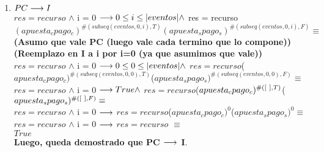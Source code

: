\documentclass[10pt,a4paper]{article}
\begin{document}
\begin{flushleft}
\begin{enumerate} \setlength\itemsep{4mm}
	\item \textbf{$PC \longrightarrow I$} \\
	\vspace{2mm}
	$res= recurso$ $\wedge$ i = 0 $\longrightarrow 0\leq i\leq|eventos| \wedge$ res = recurso$(apuesta_cpago_c)^{\#(subseq(eventos,0,i),T)}(apuesta_spago_s)^{\#(subseq(eventos,0,i),F)} \equiv$\\
	\vspace{3mm}
	\textbf{(Asumo que vale PC (luego vale cada termino que lo compone))}\\
	\vspace{3mm}
	\textbf{(Reemplazo en I a i por i=0 (ya que asumimos que vale))}\\
	\vspace{3mm}
	$res= recurso$ $\wedge$ i = 0 $\longrightarrow 0\leq 0\leq|eventos| \wedge$ $res=recurso$($apuesta_cpago_c)^{\#(subseq(eventos,0,0),T)}$($apuesta_spago_s)^{\#(subseq(eventos,0,0),F)} \equiv$\\
	\vspace{2mm}
	$res= recurso$ $\wedge$ i = 0  $\longrightarrow  True  \wedge$ $res=recurso$($apuesta_cpago_c)^{\#([\ ],T)}$($apuesta_spago_s)^{\#([\ ],F)} \equiv$ \\
	\vspace{2mm}
	$res= recurso$ $\wedge$ i = 0  $\longrightarrow$ $res=recurso$($apuesta_cpago_c)^{0}$($apuesta_spago_s)^{0} \equiv $\\
	\vspace{2mm}
	$res= recurso$ $\wedge$ i = 0  $\longrightarrow$ $res=recurso$ $\equiv $\\
	\vspace{2mm}
	$True$ \\
	\vspace{3mm}
	\textbf{Luego, queda demostrado que PC $\longrightarrow$ I}.\\


\end{enumerate}
\end{flushleft}
\end{document}
